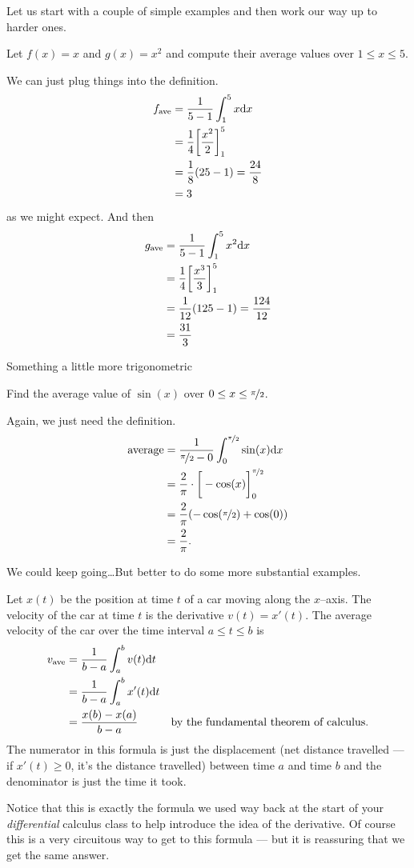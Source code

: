 Let us start with a couple of simple examples and then work our way up to harder ones.
\begin{eg}
 Let $f(x)= x$ and $g(x)=x^2$ and compute their average values
over $1 \leq x\leq 5$.

\soln We can just plug things into the definition.
\begin{align*}
  f_{\mathrm{ave}} &= \frac{1}{5-1}\int_1^5 x \mathrm{d}x \\
  &= \frac{1}{4} \bigg[ \frac{x^2}{2} \bigg]_1^5 \\
  &= \frac{1}{8} (25-1) = \frac{24}{8} \\
  &= 3
\end{align*}
as we might expect. And then
\begin{align*}
g_{\mathrm{ave}} &= \frac{1}{5-1}\int_1^5 x^2 \mathrm{d}x \\
  &= \frac{1}{4} \bigg[ \frac{x^3}{3} \bigg]_1^5 \\
  &= \frac{1}{12} (125-1) = \frac{124}{12} \\
&= \frac{31}{3}
\end{align*}
\end{eg}
Something a little more trigonometric
\begin{eg}
 Find the average value of $\sin(x)$ over $0 \leq x \leq \nicefrac{\pi}{2}$.

\soln Again, we just need the definition.
\begin{align*}
  \text{average} &= \frac{1}{\nicefrac{\pi}{2} - 0}
\int_0^{\nicefrac{\pi}{2}} \sin(x) \mathrm{d}x \\
&= \frac{2}{\pi} \cdot \bigg[ -\cos(x) \bigg]_0^{\nicefrac{\pi}{2}} \\
&= \frac{2}{\pi} (-\cos(\nicefrac{\pi}{2})+\cos(0)) \\
&= \frac{2}{\pi}.
\end{align*}
\end{eg}

We could keep going\dots But better to do some more substantial examples.
\begin{eg}\label{eg:AVvelocity}
Let $x(t)$ be the position at time $t$ of a car moving along the $x$--axis.
The velocity of the car at time $t$ is the derivative $v(t)=x'(t)$.
The average velocity of the car over the time interval $a\le t\le b$ is
\begin{align*}
v_{\mathrm{ave}} &= \frac{1}{b-a}\int_a^b v(t)\mathrm{d}t\\
&=\frac{1}{b-a}\int_a^b x'(t)\mathrm{d}t\\
&=\frac{x(b)-x(a)}{b-a} & \text{by the fundamental theorem of calculus.}
\end{align*}
The numerator in this formula is just the displacement (net distance travelled --- if
$x'(t)\ge 0$, it's the distance travelled) between time $a$ and time $b$ and the
denominator is just the time it took.

Notice that this is exactly the formula we used way back at the start of your
\emph{differential} calculus class to help introduce the idea of the derivative. Of
course this is a very circuitous way to get to this formula --- but it is reassuring that
we get the same answer.
\end{eg}

